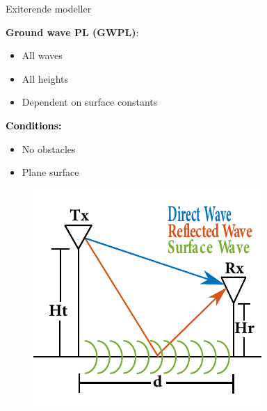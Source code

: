 \begin{frame}{Exiterende modeller}
\begin{minipage}{.45\textwidth}
\raggedright\textcolor{thomaspurple}{\textbf{Ground wave PL (GWPL)}:}
\begin{itemize}
\item All waves
\item All heights
\item Dependent on surface constants
\end{itemize} 

\vspace{1em}
\textcolor{black}{\textbf{Conditions:}}
\begin{itemize}
\item No obstacles
\item Plane surface
\end{itemize}

\end{minipage}
\begin{minipage}{0.5\textwidth}
\begin{figure}[!htbp]
 \centering
  \includegraphics[width = \columnwidth]{figures/poster_cropped_1.pdf}
  \end{figure}
\end{minipage}


\end{frame}
